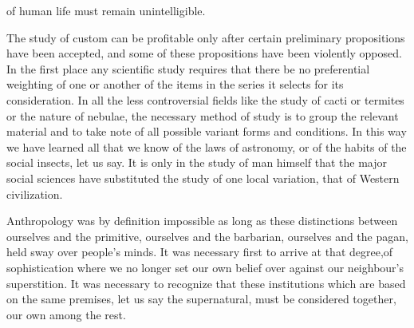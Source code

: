 \documentclass[kindlepaper]{BHCexam4kindle}
\begin{document}
of human life must remain unintelligible.
\par
The study of custom can be profitable only after certain preliminary propositions have been accepted, and
some of these propositions have been violently opposed. In the first place any scientific study requires that
there be no preferential weighting of one or another of the items in the series it selects for its consideration. In
all the less controversial fields like the study of cacti or termites or the nature of nebulae, the necessary method
of study is to group the relevant material and to take note of all possible variant forms and conditions. In this
way we have learned all that we know of the laws of astronomy, or of the habits of the social insects, let us say.
It is only in the study of man himself that the major social sciences have substituted the study of one local
variation, that of Western civilization.
\par
Anthropology was by definition impossible as long as these distinctions between ourselves and the
primitive, ourselves and the barbarian, ourselves and the pagan, held sway over people's minds. It was
necessary first to arrive at that degree,of sophistication where we no longer set our own belief over against our
neighbour's superstition. It was necessary to recognize that these institutions which are based on the same
premises, let us say the supernatural, must be considered together, our own among the rest.
\clearpage
\end{document}
